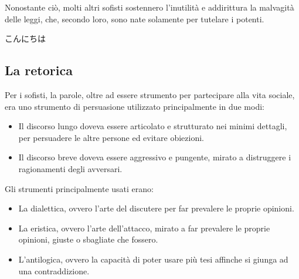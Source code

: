 \documentclass[10pt,a4paper]{article}
\begin{document}
	Nonostante ciò, molti altri sofisti sostennero l'inutilità e addirittura la malvagità delle leggi, che, secondo loro, sono nate solamente per tutelare i potenti.
	
	こんにちは
	
	\subsection{La retorica}
	
	Per i sofisti, la parole, oltre ad essere strumento per partecipare alla vita sociale, era uno strumento di persuasione utilizzato principalmente in due modi:
	\begin{itemize}
		\item Il discorso lungo doveva essere articolato e strutturato nei minimi dettagli, per persuadere le altre persone ed evitare obiezioni.
		\item Il discorso breve doveva essere aggressivo e pungente, mirato a distruggere i ragionamenti degli avversari.
	\end{itemize}

	Gli strumenti principalmente usati erano:
	\begin{itemize}
		\item La dialettica, ovvero l'arte del discutere per far prevalere le proprie opinioni.
		\item La eristica, ovvero l'arte dell'attacco, mirato a far prevalere le proprie opinioni, giuste o sbagliate che fossero.
		\item L'antilogica, ovvero la capacità di poter usare più tesi affinche si giunga ad una contraddizione.
	\end{itemize}
	
\end{document}
